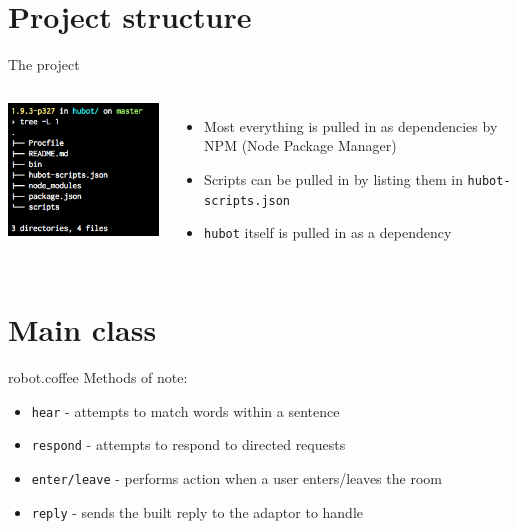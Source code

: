 \documentclass{beamer}
\begin{document}
\section{Project structure}

\begin{frame}{The project}
  \begin{columns}[c]
    \includegraphics[width=\textwidth]{tree.png}
    \begin{itemize}
      \item Most everything is pulled in as dependencies by NPM
      (Node Package Manager)
      \item Scripts can be pulled in by listing them in \texttt{hubot-scripts.json}
      \item \texttt{hubot} itself is pulled in as a dependency
    \end{itemize}
  \end{columns}
\end{frame}

\section{Main class}

\begin{frame}{robot.coffee}
Methods of note:
\begin{itemize}
  \item \texttt{hear} - attempts to match words within a sentence
  \item \texttt{respond} - attempts to respond to directed requests
  \item \texttt{enter/leave} - performs action when a user enters/leaves the room
  \item \texttt{reply} - sends the built reply to the adaptor to handle
\end{itemize}


\end{frame}
\end{document}
